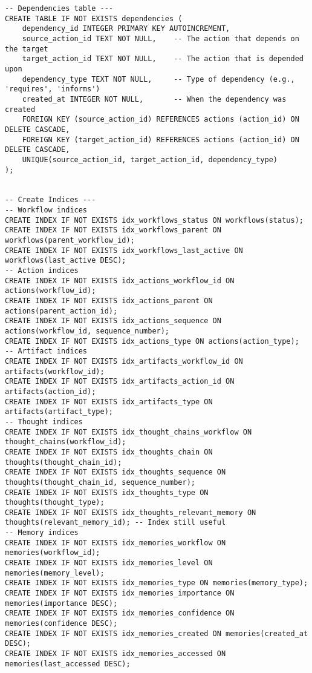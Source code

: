\documentclass[12pt,a4paper]{article}
\begin{document}
\begin{pageablecode}
\begin{verbatim}
-- Dependencies table ---
CREATE TABLE IF NOT EXISTS dependencies (
    dependency_id INTEGER PRIMARY KEY AUTOINCREMENT,
    source_action_id TEXT NOT NULL,    -- The action that depends on the target
    target_action_id TEXT NOT NULL,    -- The action that is depended upon
    dependency_type TEXT NOT NULL,     -- Type of dependency (e.g., 'requires', 'informs')
    created_at INTEGER NOT NULL,       -- When the dependency was created
    FOREIGN KEY (source_action_id) REFERENCES actions (action_id) ON DELETE CASCADE,
    FOREIGN KEY (target_action_id) REFERENCES actions (action_id) ON DELETE CASCADE,
    UNIQUE(source_action_id, target_action_id, dependency_type)
);


-- Create Indices ---
-- Workflow indices
CREATE INDEX IF NOT EXISTS idx_workflows_status ON workflows(status);
CREATE INDEX IF NOT EXISTS idx_workflows_parent ON workflows(parent_workflow_id);
CREATE INDEX IF NOT EXISTS idx_workflows_last_active ON workflows(last_active DESC);
-- Action indices
CREATE INDEX IF NOT EXISTS idx_actions_workflow_id ON actions(workflow_id);
CREATE INDEX IF NOT EXISTS idx_actions_parent ON actions(parent_action_id);
CREATE INDEX IF NOT EXISTS idx_actions_sequence ON actions(workflow_id, sequence_number);
CREATE INDEX IF NOT EXISTS idx_actions_type ON actions(action_type);
-- Artifact indices
CREATE INDEX IF NOT EXISTS idx_artifacts_workflow_id ON artifacts(workflow_id);
CREATE INDEX IF NOT EXISTS idx_artifacts_action_id ON artifacts(action_id);
CREATE INDEX IF NOT EXISTS idx_artifacts_type ON artifacts(artifact_type);
-- Thought indices
CREATE INDEX IF NOT EXISTS idx_thought_chains_workflow ON thought_chains(workflow_id);
CREATE INDEX IF NOT EXISTS idx_thoughts_chain ON thoughts(thought_chain_id);
CREATE INDEX IF NOT EXISTS idx_thoughts_sequence ON thoughts(thought_chain_id, sequence_number);
CREATE INDEX IF NOT EXISTS idx_thoughts_type ON thoughts(thought_type);
CREATE INDEX IF NOT EXISTS idx_thoughts_relevant_memory ON thoughts(relevant_memory_id); -- Index still useful
-- Memory indices
CREATE INDEX IF NOT EXISTS idx_memories_workflow ON memories(workflow_id);
CREATE INDEX IF NOT EXISTS idx_memories_level ON memories(memory_level);
CREATE INDEX IF NOT EXISTS idx_memories_type ON memories(memory_type);
CREATE INDEX IF NOT EXISTS idx_memories_importance ON memories(importance DESC);
CREATE INDEX IF NOT EXISTS idx_memories_confidence ON memories(confidence DESC);
CREATE INDEX IF NOT EXISTS idx_memories_created ON memories(created_at DESC);
CREATE INDEX IF NOT EXISTS idx_memories_accessed ON memories(last_accessed DESC);

\end{verbatim}
\end{pageablecode}
\end{document}
